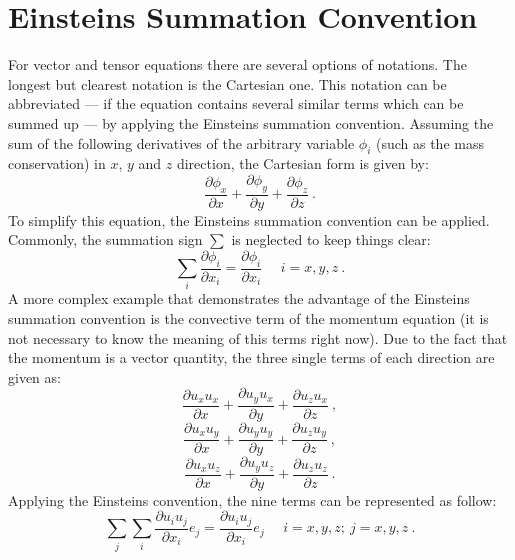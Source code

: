 \section{Einsteins Summation Convention}
%
%
	For vector and tensor equations there are several options of notations. The
    longest but clearest notation is the Cartesian one. This notation can be
    abbreviated --- if the equation contains several similar terms which can be
    summed up --- by applying the Einsteins summation convention. Assuming the
    sum of the following derivatives of the arbitrary variable $\phi_i$ (such
    as the mass conservation) in $x$, $y$ and $z$ direction, the Cartesian form
    is given by:
%
%
\begin{equation*}
 \frac{\partial \phi_x}{\partial x} + \frac{\partial \phi_y}{\partial y} + \frac{\partial \phi_z}{\partial z} ~.
\end{equation*}
%
%
	To simplify this equation, the Einsteins summation convention can be
    applied. Commonly, the summation sign $\sum$ is neglected to keep things
    clear:
%
%
\begin{equation}
  \sum_{i} \frac{\partial \phi_i}{\partial x_i} = \frac{\partial \phi_i}{\partial x_i} ~~~~~~ i=x,y,z ~.
\end{equation}
%
%
	A more complex example that demonstrates the advantage of the Einsteins
    summation convention is the convective term of the momentum equation (it
    is not necessary to know the meaning of this terms right now). Due to the
    fact that the momentum is a vector quantity, the three single terms of each
    direction are given as:
%
%
\begin{equation*}
 \frac{\partial u_x u_x}{\partial x}
 +
 \frac{\partial u_y u_x}{\partial y}
 +
 \frac{\partial u_z u_x}{\partial z}~,
\end{equation*}
%
%
\begin{equation*}
 \frac{\partial u_x u_y}{\partial x}
 +
 \frac{\partial u_y u_y}{\partial y}
 +
 \frac{\partial u_z u_y}{\partial z}~,
\end{equation*}
%
%
\begin{equation*}
 \frac{\partial u_x u_z}{\partial x}
 +
 \frac{\partial u_y u_z}{\partial y}
 +
 \frac{\partial u_z u_z}{\partial z}~.
\end{equation*}
%
%
	Applying the Einsteins convention, the nine terms can be represented as
    follow:
%
%
\begin{equation}
 \sum_j \sum_i \frac{\partial u_i u_j}{\partial x_i} e_j =  \frac{\partial u_i u_j}{\partial x_i} e_j ~~~~~~i=x,y,z; ~j=x,y,z~.
\end{equation}
